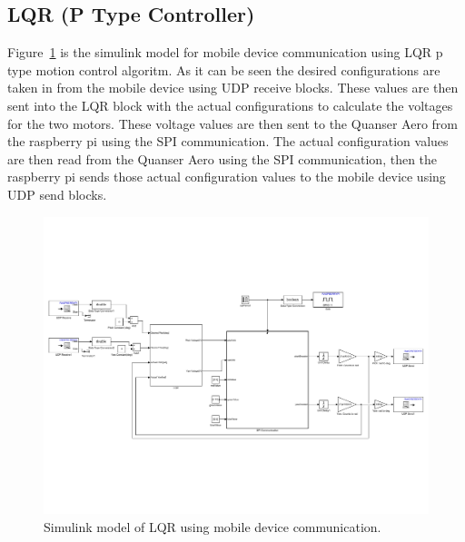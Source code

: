 \subsection{LQR (P Type Controller)}
Figure~\ref{fig:LQR_Android} is the simulink model for mobile device communication using LQR p type motion control algoritm.  As it can be seen the desired configurations are taken in from the mobile device using UDP receive blocks.  These values are then sent into the LQR block with the actual configurations to calculate the voltages for the two motors.  These voltage values are then sent to the Quanser Aero from the raspberry pi using the SPI communication.  The actual configuration values are then read from the Quanser Aero using the SPI communication, then the raspberry pi sends those actual configuration values to the mobile device using UDP send blocks.
\begin{figure}[!htbp]
    \centering
    \includegraphics[width=.72\textwidth,keepaspectratio=true]{figs/img/LQR_Android}
    \caption{Simulink model of LQR using mobile device communication.}
    \label{fig:LQR_Android}
\end{figure}

